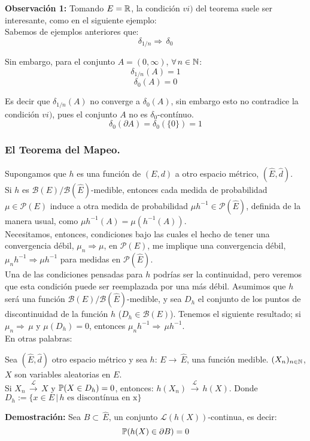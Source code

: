 \textbf{Observación 1:} Tomando $E=\mathbb R$, la condición $vi)$ del teorema suele ser interesante, como en el siguiente ejemplo:\\

Sabemos de ejemplos anteriores que:
\[\delta_{1/n}\Rightarrow \,\delta_{0}\]

Sin embargo, para el conjunto $A=(0,\infty)$, $\forall\,n\in\mathbb N$:
\[\delta_{1/n}(A) = 1\]
\[\delta_{0}(A) = 0\]

Es decir que $\delta_{1/n}(A)$ no converge a $\delta_{0}(A)$, sin embargo esto no contradice la condición $vi)$, pues el conjunto $A$ no es $\delta_0$-contínuo.
\[\delta_{0}(\partial A) = \delta_{0}(\{0\}) = 1\]


\subsubsection{El Teorema del Mapeo.}
\hspace{3.5mm}Supongamos que $h$ es una función de $(E,d)$ a otro espacio métrico, $(\hat{E},\hat{d})$. \\Si $h$ es $\mathcal{B}(E)/\mathcal{B}(\hat{E})$-medible, entonces cada medida de probabilidad $\mu \in \mathcal{P}(E)$ induce a otra medida de probabilidad $\mu h^{-1} \in \mathcal{P}(\hat{E})$, definida de la manera usual, como $\mu h^{-1}(A) = \mu(h^{-1}(A))$. \\

Necesitamos, entonces, condiciones bajo las cuales el hecho de tener una convergencia débil, $\mu_n \Rightarrow \mu$, en $\mathcal{P}(E)$, me implique una convergencia débil, $\mu_nh^{-1} \Rightarrow \mu h^{-1}$ para medidas en $\mathcal{P}(\hat{E})$. \\ 

Una de las condiciones pensadas para $h$ podrías ser la continuidad, pero veremos que esta condición puede ser reemplazada por una más débil. Asumimos que $h$ será una función $\mathcal{B}(E)/\mathcal{B}(\hat{E})$-medible, y sea $D_h$ el conjunto de los puntos de discontinuidad de la función $h$ ($D_h \in \mathcal{B}(E)$). Tenemos el siguiente resultado;  si $\mu_n \Rightarrow\,\mu$ y $\mu(D_h) = 0$, entonces $\mu_n h^{-1} \Rightarrow\, \mu h^{-1}$. \\

En otras palabras:

\begin{teorema} Sea $(\hat{E},\hat{d})$ otro espacio métrico y sea $h:\,E\rightarrow\,\hat{E}$, una función medible. $(X_n)_{n\in\mathbb N}$, $X$ son variables aleatorias en $E$.\\ \newline
Si $X_n\,\xrightarrow{\mathcal{L}}\,X$ y $\mathbb{P}(X \in D_h) = 0$, entonces: $h(X_n) \,\xrightarrow{\mathcal{L}}\,h(X)$. Donde $D_h :=\{x\in E\,|\,\text{$h$ es discontínua en x}\}$
\end{teorema}
\textbf{Demostración:} Sea $B \subset\,\hat{E}$, un conjunto $\mathcal{L}(h(X))$-continua, es decir:
\begin{equation}
    \mathbb{P}(h(X) \in \partial B) = 0
    \label{eq:dem2}
\end{equation}

